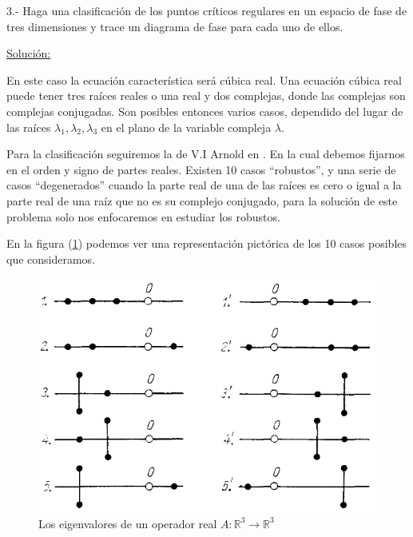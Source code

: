 \documentclass[a4paper,10pt]{article}
\numberwithin{equation}{section}
\begin{document}

\vspace{.3cm}

\newpage

3.- Haga una clasificación de los puntos críticos regulares en un espacio de fase 
de tres dimensiones y trace un diagrama de fase para cada uno de ellos.

\vspace{.3cm}

\underline{Solución:}\vspace{.3cm}

En este caso la ecuación característica será cúbica real. Una ecuación cúbica real puede
tener tres raíces reales o una real y dos complejas, donde las complejas son complejas conjugadas.
Son posibles entonces varios casos, dependido del lugar de las raíces $\lambda_1, \lambda_2, \lambda_3$
en el plano de la variable compleja $\lambda$.

Para la clasificación seguiremos la de V.I Arnold en \cite{arnold}. En la cual debemos
fijarnos en el orden y signo de partes reales. Existen 10 casos ``robustos'', y una 
serie de casos ``degenerados'' cuando la parte real de una de las raíces es cero
o igual a la parte real de una raíz que no es su complejo conjugado, para la 
solución de este problema solo nos enfocaremos en estudiar los robustos. 

\vspace{.3cm}

En la figura (\ref{fig:problema3fig1}) podemos ver una representación pictórica de los
10 casos posibles que consideramos. 

\begin{figure}[h!]
 \centering
\includegraphics[scale=0.3]{problema3fig1}
\caption{Los eigenvalores de un operador real $A: \mathbb{R}^3 \rightarrow \mathbb{R}^3$}
\label{fig:problema3fig1}
\end{figure}
\end{document}
